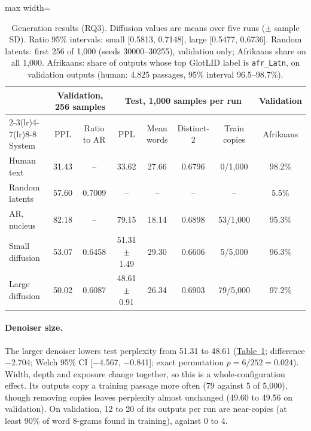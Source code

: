 \documentclass[11pt,a4paper]{article}
\begin{document}
\begin{table}[t]
\centering
\small
\setlength{\tabcolsep}{4pt}
\begin{adjustbox}{max width=\textwidth}
\begin{tabular}{lccccccc}
\toprule
& \multicolumn{2}{c}{Validation, 256 samples} & \multicolumn{4}{c}{Test, 1,000 samples per run} & Validation \\
\cmidrule(lr){2-3}\cmidrule(lr){4-7}\cmidrule(lr){8-8}
System & PPL & Ratio to AR & PPL & Mean words & Distinct-2 & Train copies & Afrikaans \\
\midrule
Human text & 31.43 & -- & 33.62 & 27.66 & 0.6796 & 0/1,000 & 98.2\% \\
Random latents & 57.60 & 0.7009 & -- & -- & -- & -- & 5.5\% \\
AR, nucleus & 82.18 & -- & 79.15 & 18.14 & 0.6898 & 53/1,000 & 95.3\% \\
Small diffusion & 53.07 & 0.6458 & 51.31 $\pm$ 1.49 & 29.30 & 0.6606 & 5/5,000 & 96.3\% \\
Large diffusion & 50.02 & 0.6087 & 48.61 $\pm$ 0.91 & 26.34 & 0.6903 & 79/5,000 & 97.2\% \\
\bottomrule
\end{tabular}
\end{adjustbox}
\caption{Generation results (RQ3). Diffusion values are means over five runs ($\pm$ sample SD). Ratio 95\% intervals: small [0.5813, 0.7148], large [0.5477, 0.6736]. Random latents: first 256 of 1,000 (seeds 30000--30255), validation only; Afrikaans share on all 1,000. Afrikaans: share of outputs whose top GlotLID label is \texttt{afr\_Latn}, on validation outputs (human: 4,825 passages, 95\% interval 96.5--98.7\%).}
\label{tab:generation}
\end{table}

\paragraph{Denoiser size.} The larger denoiser lowers test perplexity from 51.31 to 48.61 (\hyperref[tab:generation]{Table~\ref*{tab:generation}}; difference $-$2.704; Welch 95\% CI [$-$4.567, $-$0.841]; exact permutation $p = 6/252 = 0.024$). Width, depth and exposure change together, so this is a whole-configuration effect. Its outputs copy a training passage more often (79 against 5 of 5,000), though removing copies leaves perplexity almost unchanged (49.60 to 49.56 on validation). On validation, 12 to 20 of its outputs per run are near-copies (at least 90\% of word 8-grams found in training), against 0 to 4.
\end{document}
